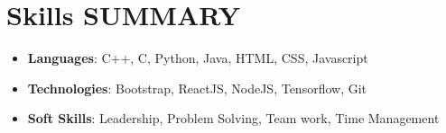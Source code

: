 \documentclass[letterpaper,11pt]{article}
\newcommand{\resumeSubHeadingListStart}{\begin{itemize}[leftmargin=*]}
\newcommand{\resumeSubHeadingListEnd}{\end{itemize}}
\begin{document}
%
\section{Skills SUMMARY}
 \resumeSubHeadingListStart
   \item{
     \textbf{Languages}{: C++, C, Python, Java,  HTML, CSS, Javascript}
     \hfill
     \textbf{}{}
   }
   \item{
     \textbf{Technologies}{: Bootstrap, ReactJS, NodeJS, Tensorflow, Git}
     \hfill
     \textbf{}{}
   }
   \item{
     \textbf{Soft Skills}{: Leadership, Problem Solving, Team work, Time Management}
     \hfill
     \textbf{}{}
   }
 \resumeSubHeadingListEnd


\end{document}
